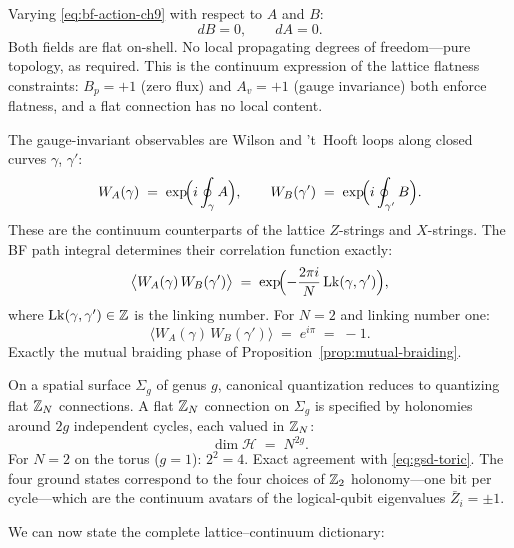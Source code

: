 Varying \eqref{eq:bf-action-ch9} with respect to $A$ and $B$:
\begin{equation}\label{eq:bf-eom-ch9}
    dB = 0, \qquad dA = 0.
\end{equation}
Both fields are flat on-shell.  No local propagating degrees of freedom---pure topology, as required.  This is the continuum expression of the lattice flatness constraints: $B_p = +1$ (zero flux) and $A_v = +1$ (gauge invariance) both enforce flatness, and a flat connection has no local content.

The gauge-invariant observables are Wilson and 't~Hooft loops along closed curves $\gamma$, $\gamma'$:
\begin{equation}\label{eq:bf-wilson-thooft}
    W_A(\gamma) \;=\; \exp\!\Bigl(i\oint_\gamma A\Bigr), \qquad W_B(\gamma') \;=\; \exp\!\Bigl(i\oint_{\gamma'} B\Bigr).
\end{equation}
These are the continuum counterparts of the lattice $Z$-strings and $X$-strings.  The BF path integral determines their correlation function exactly:
\begin{equation}\label{eq:bf-linking}
    \bigl\langle W_A(\gamma)\, W_B(\gamma') \bigr\rangle \;=\; \exp\!\Bigl(-\frac{2\pi i}{N}\,\mathrm{Lk}(\gamma, \gamma')\Bigr),
\end{equation}
where $\mathrm{Lk}(\gamma, \gamma') \in \mathbb{Z}$ is the linking number.  For $N = 2$ and linking number one:
\begin{equation}\label{eq:bf-minus-one}
    \bigl\langle W_A(\gamma)\, W_B(\gamma') \bigr\rangle \;=\; e^{i\pi} \;=\; -1.
\end{equation}
Exactly the mutual braiding phase of Proposition~\ref{prop:mutual-braiding}.

On a spatial surface $\Sigma_g$ of genus $g$, canonical quantization reduces to quantizing flat $\mathbb{Z}_N$ connections.  A flat $\mathbb{Z}_N$ connection on $\Sigma_g$ is specified by holonomies around $2g$ independent cycles, each valued in $\mathbb{Z}_N$:
\begin{equation}\label{eq:bf-gsd-ch9}
    \dim \mathcal{H} \;=\; N^{2g}.
\end{equation}
For $N = 2$ on the torus ($g = 1$): $2^2 = 4$.  Exact agreement with \eqref{eq:gsd-toric}.  The four ground states correspond to the four choices of $\mathbb{Z}_2$ holonomy---one bit per cycle---which are the continuum avatars of the logical-qubit eigenvalues $\bar{Z}_i = \pm 1$.

We can now state the complete lattice--continuum dictionary:

